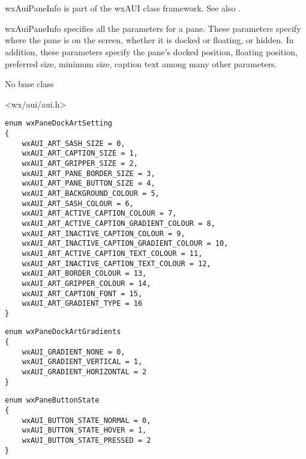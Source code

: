 \section{}\label{wxauipaneinfo}

wxAuiPaneInfo is part of the wxAUI class framework.
See also .

wxAuiPaneInfo specifies all the parameters for a pane.
These parameters specify where the pane is on the
screen, whether it is docked or floating, or hidden.
In addition, these parameters specify the pane's
docked position, floating position, preferred size,
minimum size, caption text among many other parameters.


No base class


<wx/aui/aui.h>




\begin{verbatim}
enum wxPaneDockArtSetting
{
    wxAUI_ART_SASH_SIZE = 0,
    wxAUI_ART_CAPTION_SIZE = 1,
    wxAUI_ART_GRIPPER_SIZE = 2,
    wxAUI_ART_PANE_BORDER_SIZE = 3,
    wxAUI_ART_PANE_BUTTON_SIZE = 4,
    wxAUI_ART_BACKGROUND_COLOUR = 5,
    wxAUI_ART_SASH_COLOUR = 6,
    wxAUI_ART_ACTIVE_CAPTION_COLOUR = 7,
    wxAUI_ART_ACTIVE_CAPTION_GRADIENT_COLOUR = 8,
    wxAUI_ART_INACTIVE_CAPTION_COLOUR = 9,
    wxAUI_ART_INACTIVE_CAPTION_GRADIENT_COLOUR = 10,
    wxAUI_ART_ACTIVE_CAPTION_TEXT_COLOUR = 11,
    wxAUI_ART_INACTIVE_CAPTION_TEXT_COLOUR = 12,
    wxAUI_ART_BORDER_COLOUR = 13,
    wxAUI_ART_GRIPPER_COLOUR = 14,
    wxAUI_ART_CAPTION_FONT = 15,
    wxAUI_ART_GRADIENT_TYPE = 16
}
\end{verbatim}

\begin{verbatim}
enum wxPaneDockArtGradients
{
    wxAUI_GRADIENT_NONE = 0,
    wxAUI_GRADIENT_VERTICAL = 1,
    wxAUI_GRADIENT_HORIZONTAL = 2
}
\end{verbatim}

\begin{verbatim}
enum wxPaneButtonState
{
    wxAUI_BUTTON_STATE_NORMAL = 0,
    wxAUI_BUTTON_STATE_HOVER = 1,
    wxAUI_BUTTON_STATE_PRESSED = 2
}
\end{verbatim}

